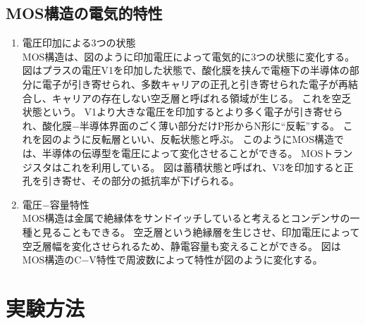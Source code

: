 \documentclass[11pt]{jarticle}
\begin{document}
	\subsection{MOS構造の電気的特性}
		\begin{enumerate}
			\item 電圧印加による3つの状態\\
				MOS構造は、図のように印加電圧によって電気的に3つの状態に変化する。
				図はプラスの電圧V1を印加した状態で、酸化膜を挟んで電極下の半導体の部分に電子が引き寄せられ、多数キャリアの正孔と引き寄せられた電子が再結合し、キャリアの存在しない空乏層と呼ばれる領域が生じる。
				これを空乏状態という。
				V1より大きな電圧を印加するとより多く電子が引き寄せられ、酸化膜−半導体界面のごく薄い部分だけP形からN形に``反転''する。
				これを図のように反転層といい、反転状態と呼ぶ。
				このようにMOS構造では、半導体の伝導型を電圧によって変化させることができる。
				MOSトランジスタはこれを利用している。
				図は蓄積状態と呼ばれ、V3を印加すると正孔を引き寄せ、その部分の抵抗率が下げられる。

			\item 電圧−容量特性\\
				MOS構造は金属で絶縁体をサンドイッチしていると考えるとコンデンサの一種と見ることもできる。
				空乏層という絶縁層を生じさせ、印加電圧によって空乏層幅を変化させられるため、静電容量も変えることができる。
				図はMOS構造のC−V特性で周波数によって特性が図のように変化する。

		\end{enumerate}

\section{実験方法}
\end{document}

